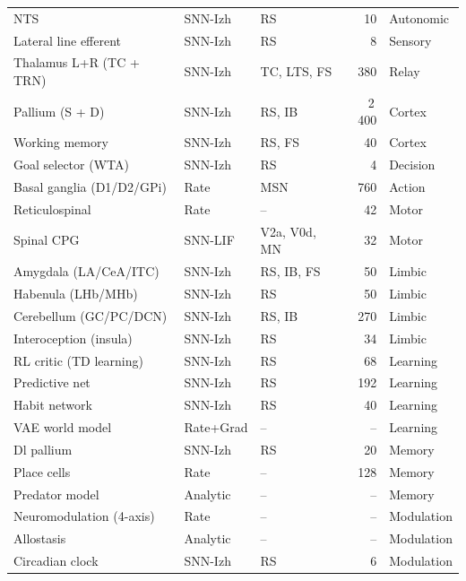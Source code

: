 \documentclass[12pt]{article}
\begin{document}
\begin{table}[H]
\begin{tabular}{lllrl}
NTS                       & SNN-Izh   & RS          & 10     & Autonomic \\
Lateral line efferent     & SNN-Izh   & RS          & 8      & Sensory \\
\midrule
Thalamus L+R (TC + TRN)   & SNN-Izh   & TC, LTS, FS & 380    & Relay \\
Pallium (S + D)           & SNN-Izh   & RS, IB      & 2\,400 & Cortex \\
Working memory            & SNN-Izh   & RS, FS      & 40     & Cortex \\
\midrule
Goal selector (WTA)       & SNN-Izh   & RS          & 4      & Decision \\
Basal ganglia (D1/D2/GPi) & Rate      & MSN         & 760    & Action \\
Reticulospinal            & Rate      & --          & 42     & Motor \\
Spinal CPG                & SNN-LIF   & V2a, V0d, MN & 32    & Motor \\
\midrule
Amygdala (LA/CeA/ITC)     & SNN-Izh   & RS, IB, FS  & 50     & Limbic \\
Habenula (LHb/MHb)        & SNN-Izh   & RS          & 50     & Limbic \\
Cerebellum (GC/PC/DCN)    & SNN-Izh   & RS, IB      & 270    & Limbic \\
Interoception (insula)    & SNN-Izh   & RS          & 34     & Limbic \\
\midrule
RL critic (TD learning)   & SNN-Izh   & RS          & 68     & Learning \\
Predictive net            & SNN-Izh   & RS          & 192    & Learning \\
Habit network             & SNN-Izh   & RS          & 40     & Learning \\
VAE world model           & Rate+Grad & --          & --     & Learning \\
\midrule
Dl pallium                & SNN-Izh   & RS          & 20     & Memory \\
Place cells               & Rate      & --          & 128    & Memory \\
Predator model            & Analytic  & --          & --     & Memory \\
Neuromodulation (4-axis)  & Rate      & --          & --     & Modulation \\
Allostasis                & Analytic  & --          & --     & Modulation \\
Circadian clock           & SNN-Izh   & RS          & 6      & Modulation \\

\end{tabular}
\end{table}
\end{document}
